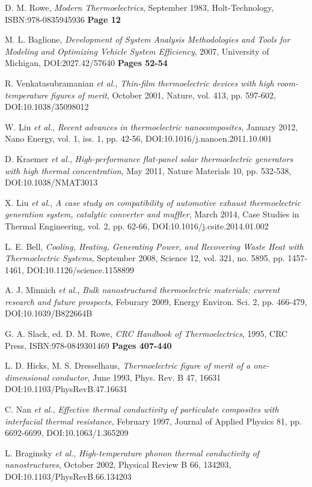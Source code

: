 \documentclass[12pt,draft]{article}
\begin{document}
\begin{thebibliography}{11}

D. M. Rowe,
\emph{Modern Thermoelectrics},
September 1983,
Holt-Technology,
ISBN:978-0835945936
\textbf{Page 12}

M. L. Baglione,
\emph{Development of System Analysis Methodologies and Tools for Modeling and Optimizing Vehicle System Efficiency},
2007,
University of Michigan,
DOI:2027.42/57640
\textbf{Pages 52-54}

R. Venkatasubramanian \emph{et al.},
\emph{Thin-film thermoelectric devices with high room-temperature figures of merit},
October 2001,
Nature, vol. 413, pp. 597-602,
DOI:10.1038/35098012

W. Liu \emph{et al.},
\emph{Recent advances in thermoelectric nanocomposites},
January 2012,
Nano Energy, vol. 1, iss. 1, pp. 42-56,
DOI:10.1016/j.nanoen.2011.10.001

D. Kraemer \emph{et al.},
\emph{High-performance flat-panel solar thermoelectric
generators with high thermal concentration},
May 2011,
Nature Materials 10, pp. 532-538,
DOI:10.1038/NMAT3013

X. Liu \emph{et al.},
\emph{A case study on compatibility of automotive exhaust thermoelectric generation system, catalytic converter and muffler},
March 2014,
Case Studies in Thermal Engineering, vol. 2, pp. 62-66,
DOI:10.1016/j.csite.2014.01.002

L. E. Bell,
\emph{Cooling, Heating, Generating Power, and Recovering Waste Heat with Thermoelectric Systems},
September 2008,
Science 12, vol. 321, no. 5895, pp. 1457-1461,
DOI:10.1126/science.1158899

A. J. Minnich \emph{et al.},
\emph{Bulk nanostructured thermoelectric materials: current research and future prospects},
Feburary 2009,
Energy Environ. Sci. 2, pp. 466-479,
DOI:10.1039/B822664B

G. A. Slack, ed. D. M. Rowe,
\emph{CRC Handbook of Thermoelectrics},
1995,
CRC Press,
ISBN:978-0849301469
\textbf{Pages 407-440}

L. D. Hicks, M. S. Dresselhaus,
\emph{Thermoelectric figure of merit of a one-dimensional conductor},
June 1993,
Phys. Rev. B 47, 16631
DOI:10.1103/PhysRevB.47.16631

C. Nan \emph{et al.},
\emph{Effective thermal conductivity of particulate composites with interfacial thermal resistance},
February 1997,
Journal of Applied Physics 81, pp. 6692-6699,
DOI:10.1063/1.365209

L. Braginsky \emph{et al.},
\emph{High-temperature phonon thermal conductivity of nanostructures},
October 2002,
Physical Review B 66, 134203,
DOI:10.1103/PhysRevB.66.134203

\end{thebibliography}
\end{document}
